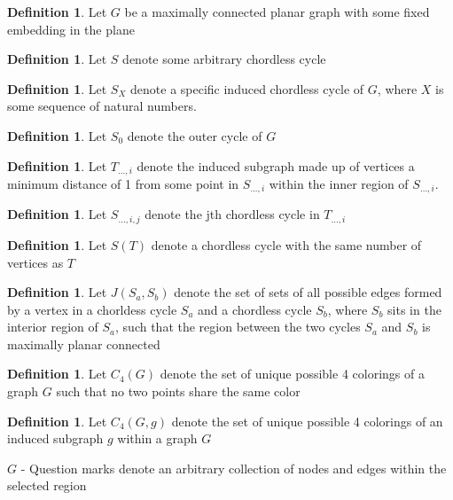 \documentclass[11pt,a4paper]{report}
\theoremstyle{plain}
\theoremstyle{definition}
\newtheorem{defn}[thm]{Definition} %
\begin{document}
\begin{defn}
    Let $G$ be a maximally connected planar graph with some fixed embedding in the plane
\end{defn}

\begin{defn}
  Let $S$ denote some arbitrary chordless cycle
\end{defn}

\begin{defn}
  Let $S_{X}$ denote a specific induced chordless cycle of $G$, where $X$ is some sequence of natural numbers.
\end{defn}

\begin{defn}
  Let $S_0$ denote the outer cycle of $G$
\end{defn}

\begin{defn}
  Let $T_{..., i}$ denote the induced subgraph made up of vertices a minimum distance of 1 from some point in $S_{..., i}$ within the inner region of $S_{..., i}$.
\end{defn}

\begin{defn}
  Let $S_{..., i, j}$ denote the jth chordless cycle in $T_{..., i}$
\end{defn}

\begin{defn}
  Let $S(T)$ denote a chordless cycle with the same number of vertices as $T$
\end{defn}

\begin{defn}
  Let $J(S_a, S_b)$ denote the set of sets of all possible edges formed by a vertex in a chorldess cycle $S_a$ and a chordless cycle $S_b$, where $S_b$ sits in the interior region of $S_a$, such that the region between the two cycles $S_a$ and $S_b$ is maximally planar connected
\end{defn}

\begin{defn}
  Let $C_4(G)$ denote the set of unique possible 4 colorings of a graph $G$ such that no two points share the same color
\end{defn}

\begin{defn}
  Let $C_4(G, g)$ denote the set of unique possible 4 colorings of an induced subgraph $g$ within a graph $G$
\end{defn}

\caption{
  $G$ - Question marks denote an arbitrary collection of nodes and edges within the selected region
}
\end{document}
